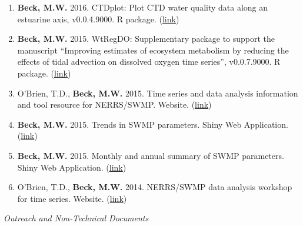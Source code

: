 \documentclass[letterpaper,12pt]{article}
\begin{document}
\begin{enumerate}
\item \textbf{Beck, M.W.} 2016. CTDplot: Plot CTD water quality data along an estuarine axis, v0.0.4.9000. R package. (\href{https://github.com/fawda123/CTDplot}{link})

\item \textbf{Beck, M.W.} 2015. WtRegDO: Supplementary package to support the manuscript ``Improving estimates of ecosystem metabolism by reducing the effects of tidal advection on dissolved oxygen time series'', v0.0.7.9000. R package. (\href{http://github.com/fawda123/WtRegDO}{link})

\item O'Brien, T.D., \textbf{Beck, M.W.} 2015. Time series and data analysis information and tool resource for NERRS/SWMP. Website. (\href{http://swmprats.net/}{link})

\item \textbf{Beck, M.W.} 2015. Trends in SWMP parameters. Shiny Web Application. (\href{http://beckmw.shinyapps.io/swmp_comp/}{link})

\item \textbf{Beck, M.W.} 2015. Monthly and annual summary of SWMP parameters. Shiny Web Application. (\href{http://beckmw.shinyapps.io/swmp_summary/}{link})

\item O'Brien, T.D., \textbf{Beck, M.W.} 2014. NERRS/SWMP data analysis workshop for time series. Website. (\href{http://copepod.org/nerrs-swmp-workshop/}{link})

\end{enumerate}

\vspace{\baselineskip} 
\centerline{\large{\textit{Outreach and Non-Technical Documents}}}
\end{document}
